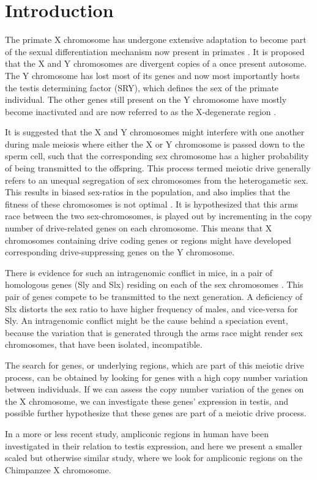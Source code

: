 \section*{Introduction}


The primate X chromosome has undergone extensive adaptation to become part of the sexual differentiation mechanism now present in primates \cite{skaletsklyMSY}.  It is proposed that the X and Y chromosomes are divergent copies of a once present autosome. The Y chromosome has lost most of its genes and now most importantly hosts the testis determining factor (SRY), which defines the sex of the primate individual. The other genes still present on the Y chromosome have mostly become inactivated and are now referred to as the X-degenerate region \cite{skaletsklyMSY}.


It is suggested that the X and Y chromosomes might interfere with one another during male meiosis where either the X or Y chromosome is passed down to the sperm cell, such that the corresponding sex chromosome has a higher probability of being transmitted to the offspring. This process termed meiotic drive generally refers to an unequal segregation of sex chromosomes from the heterogametic sex. This results in biased sex-ratios in the population, and also implies that the fitness of these chromosomes is not optimal \cite{doi:jaenike_10.1146/annurev.ecolsys.32.081501.113958}. It is hypothesized that this arms race between the two sex-chromosomes, is played out by incrementing in the copy number of drive-related genes on each chromosome. This means that X chromosomes containing drive coding genes or regions might have developed corresponding drive-suppressing genes on the Y chromosome. 

There is evidence for such an intragenomic conflict in mice, in a pair of homologous genes (Sly and Slx) residing on each of the sex chromosomes \cite{SOH2014800}. This pair of genes compete to be transmitted to the next generation. A deficiency of Slx distorts the sex ratio to have higher frequency of males, and vice-versa for Sly. An intragenomic conflict might be the cause behind a speciation event, because the variation that is generated through the arms race might render sex chromosomes, that have been isolated, incompatible.

The search for genes, or underlying regions, which are part of this meiotic drive process, can be obtained by looking for genes with a high copy number variation between individuals. If we can assess the copy number variation of the genes on the X chromosome, we can investigate these genes' expression in testis, and possible further hypothesize that these genes are part of a meiotic drive process.

In a more or less recent study\cite{Lucotte907}, ampliconic regions in human have been investigated in their relation to testis expression, and here we present a smaller scaled but otherwise similar study, where we look for ampliconic regions on the Chimpanzee X chromosome.



